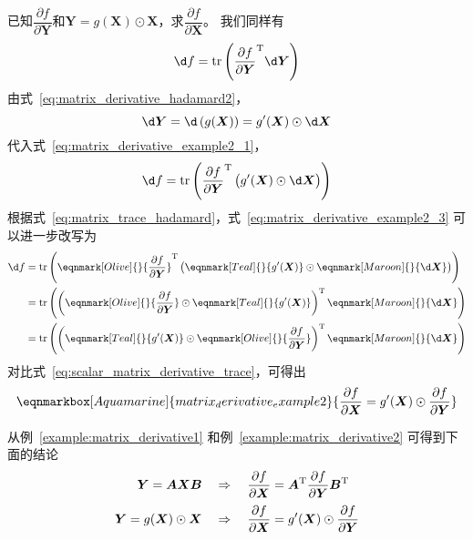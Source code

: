 \begin{example}\label{example:matrix_derivative2}
\colorbox{Aquamarine!30}{已知$\dfrac{\partial f}{\partial \bm{Y}}$和$\bm{Y}=g(\bm{X})\odot\bm{X}$，求$\dfrac{\partial f}{\partial \bm{X}}$}。
我们同样有
\begin{equation}
	\d f = \mathrm{tr}\left({\frac{\partial f}{\partial \bm{Y}}}^{\mathrm{T}}\d \bm{Y}\right)
	\label{eq:matrix_derivative_example2_1}
\end{equation}
由式~\eqref{eq:matrix_derivative_hadamard2}，
\begin{equation}
	\d \bm{Y} = \d \left(g(\bm{X})\right) = g'(\bm{X}) \odot \d \bm{X}
	\label{eq:matrix_derivative_example2_2}
\end{equation}
代入式~\eqref{eq:matrix_derivative_example2_1}，
\begin{equation}
	\d f = \mathrm{tr}\left({\frac{\partial f}{\partial \bm{Y}}}^{\mathrm{T}}\left(\vphantom{A^T}g'(\bm{X}) \odot \d \bm{X}\right)\right)
	\label{eq:matrix_derivative_example2_3}
\end{equation}
根据式~\eqref{eq:matrix_trace_hadamard}，式~\eqref{eq:matrix_derivative_example2_3} 可以进一步改写为
\begin{equation}
	\begin{aligned}
		\d f 
		&= \mathrm{tr}\left(\eqnmark[Olive]{}{\frac{\partial f}{\partial \bm{Y}}}^{\mathrm{T}}\left(\vphantom{A^T}\eqnmark[Teal]{}{g'(\bm{X})} \odot \eqnmark[Maroon]{}{\d \bm{X}}\right)\right) \\
		&= \mathrm{tr}\left(\left({\eqnmark[Olive]{}{\frac{\partial f}{\partial \bm{Y}}}\odot \eqnmark[Teal]{}{g'(\bm{X})}}\right)^{\mathrm{T}}\eqnmark[Maroon]{}{\d \bm{X}}\right) \\
		&= \mathrm{tr}\left(\left({\eqnmark[Teal]{}{g'(\bm{X})} \odot \eqnmark[Olive]{}{\frac{\partial f}{\partial \bm{Y}}}}\right)^{\mathrm{T}}\eqnmark[Maroon]{}{\d \bm{X}}\right)
	\end{aligned}
\end{equation}
对比式~\eqref{eq:scalar_matrix_derivative_trace}，可得出
\renewcommand{\eqnhighlightshade}{30}  %
\begin{equation}
	\eqnmarkbox[Aquamarine]{matrix_derivative_example2}{
	\frac{\partial f}{\partial \bm{X}} = g'(\bm{X}) \odot \frac{\partial f}{\partial \bm{Y}}
	}
	\label{eq:matrix_derivative_example2_4}
\end{equation}
\end{example}

从例~\ref{example:matrix_derivative1} 和例~\ref{example:matrix_derivative2} 可得到下面的结论
\begin{align}
	\bm{Y}=\bm{A}\bm{X}\bm{B} \quad &\Rightarrow \quad \frac{\partial f}{\partial \bm{X}} = \bm{A}^{\mathrm{T}}\frac{\partial f}{\partial \bm{Y}}\bm{B}^{\mathrm{T}}
	\label{eq:matrix_derivative_conclusion1} \\ %
	\bm{Y}=g(\bm{X})\odot\bm{X} \quad &\Rightarrow \quad \frac{\partial f}{\partial \bm{X}} = g'(\bm{X}) \odot \frac{\partial f}{\partial \bm{Y}} \vphantom{{\frac{\partial f}{\partial \bm{X}}}^{\mathrm{T}}}
	\label{eq:matrix_derivative_conclusion2}  %
\end{align}
